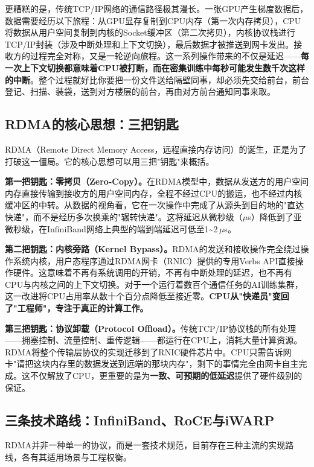 更糟糕的是，传统TCP/IP网络的通信路径极其漫长。一张GPU产生梯度数据后，数据需要经历以下旅程：从GPU显存复制到CPU内存（第一次内存拷贝），CPU将数据从用户空间复制到内核的Socket缓冲区（第二次拷贝），内核协议栈进行TCP/IP封装（涉及中断处理和上下文切换），最后数据才被推送到网卡发出。接收方的过程完全对称，又是一轮逆向旅程。这一系列操作带来的不仅是延迟——\textbf{每一次上下文切换都意味着CPU被打断，而在密集训练中每秒可能发生数千次这样的中断}。整个过程就好比你要把一份文件送给隔壁同事，却必须先交给前台，前台登记、扫描、装袋，送到对方楼层的前台，再由对方前台通知同事来取。

\subsection{RDMA的核心思想：三把钥匙}

RDMA（Remote Direct Memory Access，远程直接内存访问）的诞生，正是为了打破这一僵局。它的核心思想可以用三把"钥匙"来概括。

\textbf{第一把钥匙：零拷贝（Zero-Copy）。}在RDMA模型中，数据从发送方的用户空间内存直接传输到接收方的用户空间内存，全程不经过CPU的搬运，也不经过内核缓冲区的中转。从数据的视角看，它在一次操作中完成了从源头到目的地的"直达快递"，而不是经历多次换乘的"辗转快递"。这将延迟从微秒级（$\mu$s）降低到了亚微秒级，在InfiniBand网络上典型的端到端延迟可低至1\textasciitilde2\,$\mu$s。

\textbf{第二把钥匙：内核旁路（Kernel Bypass）。}RDMA的发送和接收操作完全绕过操作系统内核，用户态程序通过RDMA网卡（RNIC）提供的专用Verbs API直接操作硬件。这意味着不再有系统调用的开销，不再有中断处理的延迟，也不再有CPU与内核之间的上下文切换。对于一个运行着数百个通信任务的AI训练集群，这一改进将CPU占用率从数十个百分点降低至接近零。\textbf{CPU从"快递员"变回了"工程师"，专注于真正的计算工作。}

\textbf{第三把钥匙：协议卸载（Protocol Offload）。}传统TCP/IP协议栈的所有处理——拥塞控制、流量控制、重传逻辑——都运行在CPU上，消耗大量计算资源。RDMA将整个传输层协议的实现迁移到了RNIC硬件芯片中。CPU只需告诉网卡"请把这块内存里的数据发送到远端的那块内存"，剩下的事情完全由网卡自主完成。这不仅解放了CPU，更重要的是为\textbf{一致、可预期的低延迟}提供了硬件级别的保证。

\subsection{三条技术路线：InfiniBand、RoCE与iWARP}

RDMA并非一种单一的协议，而是一套技术规范，目前存在三种主流的实现路线，各有其适用场景与工程权衡。

